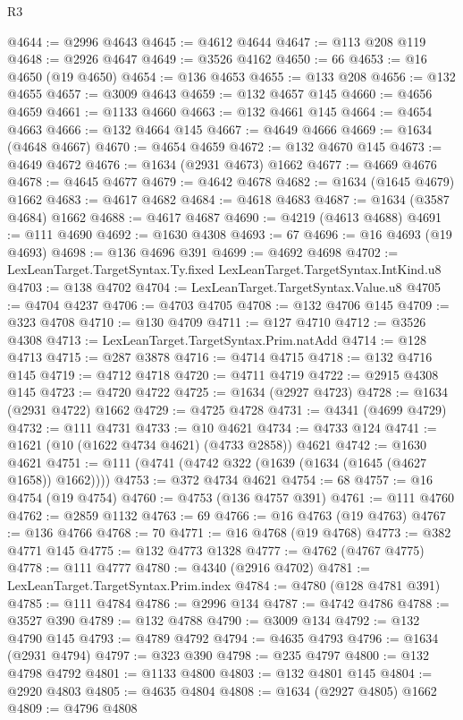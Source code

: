 \begin{lexlean}{R3}
\begin{coremodule}
@4644 := @2996 @4643
@4645 := @4612 @4644
@4647 := @113 @208 @119
@4648 := @2926 @4647
@4649 := @3526 @4162
@4650 := 66
@4653 := @16 @4650 (@19 @4650)
@4654 := @136 @4653
@4655 := @133 @208
@4656 := @132 @4655
@4657 := @3009 @4643
@4659 := @132 @4657 @145
@4660 := @4656 @4659
@4661 := @1133 @4660
@4663 := @132 @4661 @145
@4664 := @4654 @4663
@4666 := @132 @4664 @145
@4667 := @4649 @4666
@4669 := @1634 (@4648 @4667)
@4670 := @4654 @4659
@4672 := @132 @4670 @145
@4673 := @4649 @4672
@4676 := @1634 (@2931 @4673) @1662
@4677 := @4669 @4676
@4678 := @4645 @4677
@4679 := @4642 @4678
@4682 := @1634 (@1645 @4679) @1662
@4683 := @4617 @4682
@4684 := @4618 @4683
@4687 := @1634 (@3587 @4684) @1662
@4688 := @4617 @4687
@4690 := @4219 (@4613 @4688)
@4691 := @111 @4690
@4692 := @1630 @4308
@4693 := 67
@4696 := @16 @4693 (@19 @4693)
@4698 := @136 @4696 @391
@4699 := @4692 @4698
@4702 := LexLeanTarget.TargetSyntax.Ty.fixed LexLeanTarget.TargetSyntax.IntKind.u8
@4703 := @138 @4702
@4704 := LexLeanTarget.TargetSyntax.Value.u8
@4705 := @4704 @4237
@4706 := @4703 @4705
@4708 := @132 @4706 @145
@4709 := @323 @4708
@4710 := @130 @4709
@4711 := @127 @4710
@4712 := @3526 @4308
@4713 := LexLeanTarget.TargetSyntax.Prim.natAdd
@4714 := @128 @4713
@4715 := @287 @3878
@4716 := @4714 @4715
@4718 := @132 @4716 @145
@4719 := @4712 @4718
@4720 := @4711 @4719
@4722 := @2915 @4308 @145
@4723 := @4720 @4722
@4725 := @1634 (@2927 @4723)
@4728 := @1634 (@2931 @4722) @1662
@4729 := @4725 @4728
@4731 := @4341 (@4699 @4729)
@4732 := @111 @4731
@4733 := @10 @4621
@4734 := @4733 @124
@4741 := @1621 (@10 (@1622 @4734 @4621) (@4733 @2858)) @4621
@4742 := @1630 @4621
@4751 := @111 (@4741 (@4742 @322 (@1639 (@1634 (@1645 (@4627 @1658)) @1662))))
@4753 := @372 @4734 @4621
@4754 := 68
@4757 := @16 @4754 (@19 @4754)
@4760 := @4753 (@136 @4757 @391)
@4761 := @111 @4760
@4762 := @2859 @1132
@4763 := 69
@4766 := @16 @4763 (@19 @4763)
@4767 := @136 @4766
@4768 := 70
@4771 := @16 @4768 (@19 @4768)
@4773 := @382 @4771 @145
@4775 := @132 @4773 @1328
@4777 := @4762 (@4767 @4775)
@4778 := @111 @4777
@4780 := @4340 (@2916 @4702)
@4781 := LexLeanTarget.TargetSyntax.Prim.index
@4784 := @4780 (@128 @4781 @391)
@4785 := @111 @4784
@4786 := @2996 @134
@4787 := @4742 @4786
@4788 := @3527 @390
@4789 := @132 @4788
@4790 := @3009 @134
@4792 := @132 @4790 @145
@4793 := @4789 @4792
@4794 := @4635 @4793
@4796 := @1634 (@2931 @4794)
@4797 := @323 @390
@4798 := @235 @4797
@4800 := @132 @4798 @4792
@4801 := @1133 @4800
@4803 := @132 @4801 @145
@4804 := @2920 @4803
@4805 := @4635 @4804
@4808 := @1634 (@2927 @4805) @1662
@4809 := @4796 @4808

\end{coremodule}
\end{lexlean}
